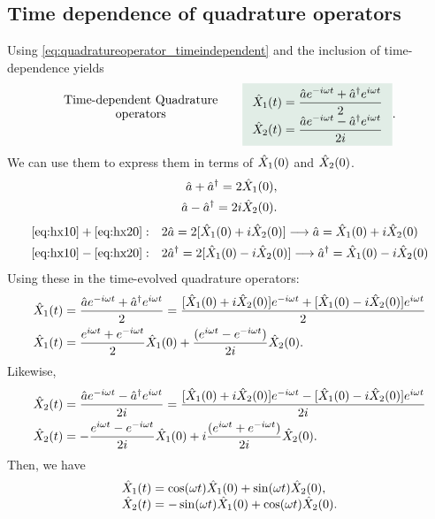 \subsection{Time dependence of quadrature operators}
Using \eqref{eq:quadratureoperator_timeindependent} and the inclusion of time-dependence yields
\begin{align}
    \shortstack{Time-dependent Quadrature\\operators}\qquad\highlight{\begin{array}{l}
        \hX_1(t)=\dfrac{\ha e^{-i\omega t}+\ha^\dagger e^{i\omega t}}{2}\\
        \hX_2(t)=\dfrac{\ha e^{-i\omega t}-\ha^\dagger e^{i\omega t}}{2i}
    \end{array}}.
    \label{eq:quadratureoperator_timedependent}
\end{align}
We can use them to express them in terms of $\hat{X}_1(0)$ and $\hat{X}_2(0)$.
\begin{align}
    \hat{a}+\hat{a}^\dagger=2\hat{X}_1(0),\label{eq:hx10}\\
    \hat{a}-\hat{a}^\dagger=2i\hat{X}_2(0)\label{eq:hx20}.
\end{align}
\begin{align*}
    \eqref{eq:hx10}+\eqref{eq:hx20}:&\quad2\hat{a}=2[\hat{X}_1(0)+i\hat{X}_2(0)]\longrightarrow\hat{a}=\hat{X}_1(0)+i\hat{X}_2(0)\\
    \eqref{eq:hx10}-\eqref{eq:hx20}:&\quad2\hat{a}^\dagger=2[\hat{X}_1(0)-i\hat{X}_2(0)]\longrightarrow\hat{a}^\dagger=\hat{X}_1(0)-i\hat{X}_2(0)
\end{align*}
Using these in the time-evolved quadrature operators:
\begin{align*}
\hat{X}_1(t)&=\frac{\hat{a} e^{-i\omega t}+\hat{a}^\dagger e^{i\omega t}}{2}=\frac{[\hat{X}_1(0)+i\hat{X}_2(0)]e^{-i\omega t}+[\hat{X}_1(0)-i\hat{X}_2(0)]e^{i\omega t}}{2}\\
\hat{X}_1(t)&=\frac{e^{i\omega t}+e^{-i\omega t}}{2}\hat{X}_1(0)+\frac{(e^{i\omega t}-e^{-i\omega t})}{2i}\hat{X}_2(0).
\end{align*}
Likewise,
\begin{align*}
\hat{X}_2(t)&=\frac{\hat{a} e^{-i\omega t}-\hat{a}^\dagger e^{i\omega t}}{2i}=\frac{[\hat{X}_1(0)+i\hat{X}_2(0)]e^{-i\omega t}-[\hat{X}_1(0)-i\hat{X}_2(0)]e^{i\omega t}}{2i}\\
\hat{X}_2(t)&=-\frac{e^{i\omega t}-e^{-i\omega t}}{2i}\hat{X}_1(0)+i\frac{(e^{i\omega t}+e^{-i\omega t})}{2i}\hat{X}_2(0).
\end{align*} 
Then, we have 
\begin{align}
    \begin{array}{l}
        \hat{X}_1(t)=\cos(\omega t)\hat{X}_1(0)+\sin(\omega t)\hat{X}_2(0),\\
        \hat{X}_2(t)=-\sin(\omega t)\hat{X}_1(0)+\cos(\omega t)\hat{X}_2(0).
    \end{array}
\end{align}
%
